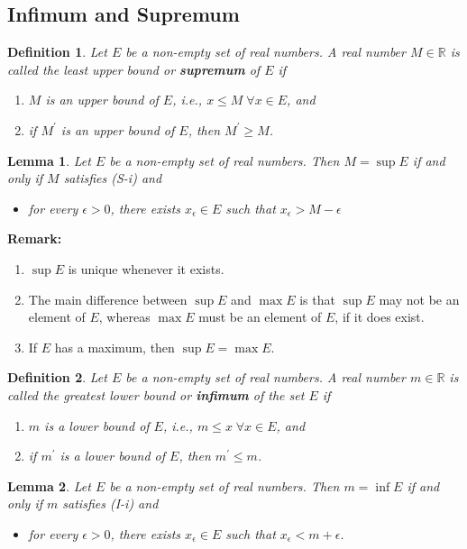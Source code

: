 \documentclass[8pt]{article}
\newtheorem{definition}{Definition}[section]
\newtheorem{lemma}{Lemma}[section]
\theoremstyle{definition}
\begin{document}
\subsection{Infimum and Supremum}
\begin{definition}\normalfont Let $E$ be a non-empty set of real numbers. A real number $M\in\mathbb{R}$ is called the least upper bound or \textbf{supremum} of $E$ if
\begin{enumerate}[label=(S-\roman*)]
\item $M$ is an upper bound of $E$, i.e., $x\leq M\;\forall x\in E$, and
\item if $M^\prime$ is an upper bound of $E$, then $M^\prime\geq M$.
\end{enumerate}
\end{definition}
\begin{lemma}\normalfont Let $E$ be a non-empty set of real numbers. Then $M=\sup E$ if and only if $M$ satisfies (S-i) and
\begin{itemize}
\item[(S-ii'] for every $\epsilon>0$, there exists $x_\epsilon\in E$ such that $x_\epsilon>M-\epsilon$
\end{itemize}
\end{lemma}
\textbf{Remark:}
\begin{enumerate}[label=(\roman*)]
\item $\sup E$ is unique whenever it exists.
\item The main difference between $\sup E$ and $\max E$ is that $\sup E$ may not be an element of $E$, whereas $\max E$ must be an element of $E$, if it does exist.
\item If $E$ has a maximum, then $\sup E = \max E$.
\end{enumerate}
\begin{definition}\normalfont Let $E$ be a non-empty set of real numbers. A real number $m\in\mathbb{R}$ is called the greatest lower bound or \textbf{infimum} of the set $E$ if
\begin{enumerate}[label=(I-\roman*)]
\item $m$ is a lower bound of $E$, i.e., $m\leq x\;\forall x\in E$, and
\item if $m^\prime$ is a lower bound of $E$, then $m^\prime\leq m$.
\end{enumerate}
\end{definition}
\begin{lemma}\normalfont Let $E$ be a non-empty set of real numbers. Then $m=\inf E$ if and only if $m$ satisfies (I-i) and 
\begin{itemize}
\item[(I-ii')] for every $\epsilon>0$, there exists $x_\epsilon\in E$ such that $x_\epsilon<m+\epsilon$.
\end{itemize}
\end{lemma}
\end{document}
